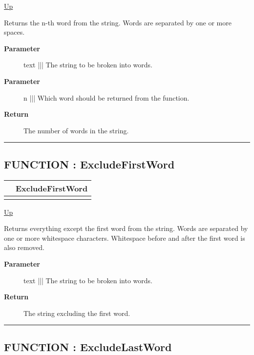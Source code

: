 \hyperlink{ecldoc:Str}{Up}

\par
Returns the n-th word from the string. Words are separated by one or more spaces.

\par
\begin{description}
\item [\textbf{Parameter}] text ||| The string to be broken into words.
\item [\textbf{Parameter}] n ||| Which word should be returned from the function.
\item [\textbf{Return}] The number of words in the string.
\end{description}

\rule{\textwidth}{0.4pt}
\subsection*{FUNCTION : ExcludeFirstWord}
\hypertarget{ecldoc:str.excludefirstword}{}

{\renewcommand{\arraystretch}{1.5}
\begin{tabularx}{\textwidth}{|>{\raggedright\arraybackslash}l|X|}
\hline
\hspace{0pt} & ExcludeFirstWord \\
\hline
\multicolumn{2}{|>{\raggedright\arraybackslash}X|}{\hspace{0pt}(STRING text)} \\
\hline
\end{tabularx}
}

\hyperlink{ecldoc:Str}{Up}

\par
Returns everything except the first word from the string. Words are separated by one or more whitespace characters. Whitespace before and after the first word is also removed.

\par
\begin{description}
\item [\textbf{Parameter}] text ||| The string to be broken into words.
\item [\textbf{Return}] The string excluding the first word.
\end{description}

\rule{\textwidth}{0.4pt}
\subsection*{FUNCTION : ExcludeLastWord}
\hypertarget{ecldoc:str.excludelastword}{}

